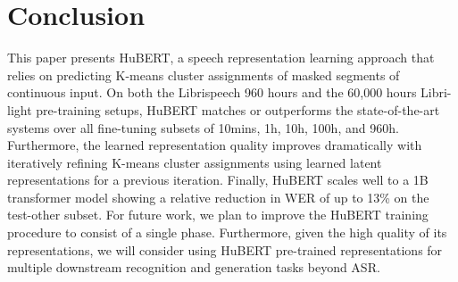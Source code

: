 \section{Conclusion}
This paper presents HuBERT, a speech representation learning approach that relies on predicting K-means cluster assignments of masked segments of continuous input. On both the Librispeech 960 hours and the 60,000 hours Libri-light pre-training setups, HuBERT matches or outperforms the state-of-the-art systems over all fine-tuning subsets of 10mins, 1h, 10h, 100h, and 960h. Furthermore, the learned representation quality improves dramatically with iteratively refining K-means cluster assignments using learned latent representations for a previous iteration. Finally, HuBERT scales well to a 1B transformer model showing a relative reduction in WER of up to 13\% on the test-other subset. For future work, we plan to improve the HuBERT training procedure to consist of a single phase. Furthermore, given the high quality of its representations, we will consider using HuBERT pre-trained representations for multiple downstream recognition and generation tasks beyond ASR.